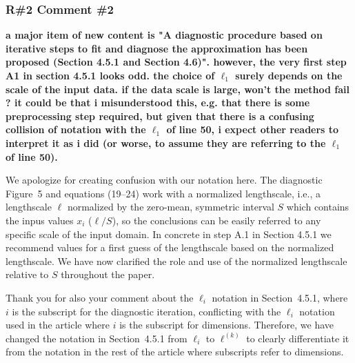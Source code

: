 \documentclass[11pt]{report}
\begin{document}
\subsubsection*{R\#2 Comment \#2}

\textbf{a major item of new content is "A diagnostic procedure based on iterative steps to fit and diagnose the approximation has been proposed (Section 4.5.1 and Section 4.6)". however, the very first step A1 in section 4.5.1 looks odd. the choice of $\ell_1$ surely depends on the scale of the input data. if the data scale is large, won't the method fail ? it could be that i misunderstood this, e.g. that there is some preprocessing step required, but given that there is a confusing collision of notation with the $\ell_1$ of line 50, i expect other readers to interpret it as i did (or worse, to assume they are referring to the $\ell_1$ of line 50).}

We apologize for creating confusion with our notation here. The diagnostic Figure~5 and equations (19--24) work with a normalized lengthscale, i.e., a lengthscale $\ell$ normalized by the zero-mean, symmetric interval $S$ which contains the inpus values $x_i$ ($\ell/S$), so the conclusions can be easily referred to any specific scale of the input domain. In concrete in step A.1 in Section 4.5.1 we recommend values for a first guess of the lengthscale based on the normalized lengthscale. We have now clarified the role and use of the normalized lengthscale relative to $S$ throughout the paper.

Thank you for also your comment about the $\ell_i$ notation in Section~4.5.1, where $i$ is the subscript for the diagnostic iteration, conflicting with the $\ell_i$ notation used in the article where $i$ is the subscript for dimensions. Therefore, we have changed the notation in Section~4.5.1 from $\ell_i$ to $\ell^{(k)}$ to clearly differentiate it from the notation in the rest of the article where subscripts refer to dimensions.
\end{document}
